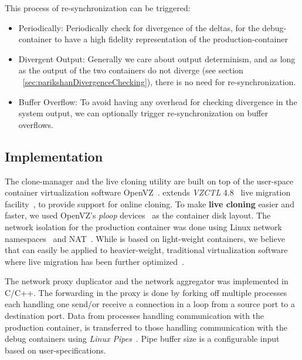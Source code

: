 This process of re-synchronization can be triggered:
\begin{itemize}
	\item Periodically: Periodically check for divergence of the deltas, for the debug-container to have a high fidelity representation of the production-container
	\item Divergent Output: Generally we care about output determinism, and as long as the output of the two containers do not diverge (see section ~\ref{sec:parikshanDivergenceChecking}), there is no need for re-synchronization.
	\item Buffer Overflow: To avoid having any overhead for checking divergence in the system output, we can optionally trigger re-synchronization on buffer overflows.
\end{itemize}



\subsection{Implementation}
\label{sec:parikshanImplementation}
The clone-manager and the live cloning utility are built on top of the user-space container virtualization software OpenVZ~\cite{openvz}.
\parikshan extends \emph{VZCTL} 4.8~\cite{vzctl} live migration facility~\cite{mirkin2008containers}, to provide support for online cloning.
To make \textbf{live cloning} easier and faster, we used OpenVZ's \textit{ploop} devices~\cite{ploop} as the container disk layout.
The network isolation for the production container was done using Linux network namespaces~\cite{netns} and NAT~\cite{nat}.
While \parikshan is based on light-weight containers, we believe that \parikshan can easily be applied to heavier-weight, traditional virtualization software where live migration has been further optimized~\cite{liveVMprinciples,trafficliveVM}.

The network proxy duplicator and the network aggregator was implemented in C/C++.
The forwarding in the proxy is done by forking off multiple processes each handling one send/or receive a connection in a loop from a source port to a destination port.
Data from processes handling communication with the production container, is transferred to those handling communication with the debug containers using \emph{Linux Pipes}~\cite{linuxpipes}.
Pipe buffer size is a configurable input based on user-specifications.

